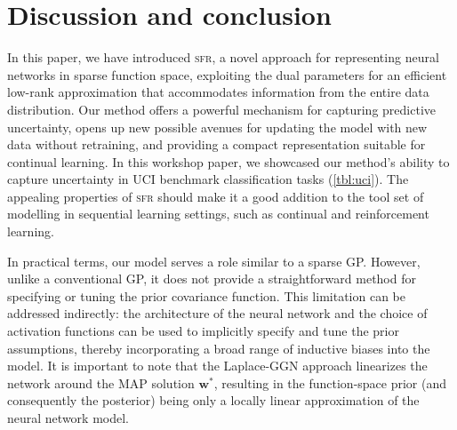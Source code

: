 \documentclass{article}
\newcommand{\our}{\textsc{sfr}\xspace}
\newcommand{\weights}{\ensuremath{\mathbf{w}}}
\begin{document}
\section{Discussion and conclusion}
\label{sec:conclusion}
%
In this paper, we have introduced \our, a novel approach for representing neural networks in sparse function space, exploiting the dual parameters for an efficient low-rank approximation that accommodates information from the entire data distribution. Our method offers a powerful mechanism for capturing predictive uncertainty, opens up new possible avenues for updating the model with new data without retraining, and providing a compact representation suitable for continual learning. In this workshop paper, we showcased our method's ability to capture uncertainty in UCI benchmark classification tasks (\cref{tbl:uci}). The appealing properties of \our should make it a good addition to the tool set of modelling in sequential learning settings, such as continual and reinforcement learning.

In practical terms, our model serves a role similar to a sparse GP. However, unlike a conventional GP, it does not provide a straightforward method for specifying or tuning the prior covariance function. This limitation can be addressed indirectly: the architecture of the neural network and the choice of activation functions can be used to implicitly specify and tune the prior assumptions, thereby incorporating a broad range of inductive biases into the model. It is important to note that the Laplace-GGN approach linearizes the network around the MAP solution $\weights^{*}$, resulting in the function-space prior (and consequently the posterior) being only a locally linear approximation of the neural network model.



\clearpage






\newpage
\appendix
\onecolumn
\end{document}
